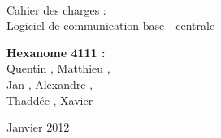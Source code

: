 \documentclass[a4paper]{article}
\begin{document}
\begin{titlepage}
~ 
\vfill
	\begin{center}
		\begin{Huge}
		Cahier des charges :\\ Logiciel de communication base - centrale
		\end{Huge} 
\vfill
		\textbf{Hexanome 4111 :} 
		\\Quentin {}, Matthieu , 
		\\Jan {}, Alexandre , 
		\\Thaddée , Xavier \\
\vfill		
		\begin{Large}
		Janvier 2012
		\end{Large}
\vfill
	\begin{tabular}{|c|c|c|c|}
 	 \hline
	\end{tabular}
	\end{center}
\vfill
\end{titlepage}
\newpage
\tableofcontents
\newpage




\end{document}
